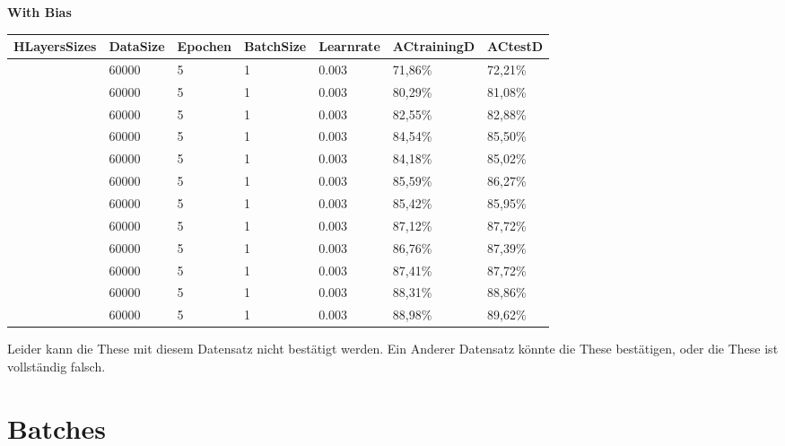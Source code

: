 \documentclass[12pt]{article}
\begin{document}
\begin{table}[H]
    \centering
    \textbf{With Bias}
    \begin{tabular}{|l|l|l|l|l|l|l|}
    \hline
        HLayersSizes & DataSize & Epochen & BatchSize & Learnrate & ACtrainingD & ACtestD \\ \hline
        [784, 10, 10] & 60000 & 5 & 1 & 0.003 & 71,86\% & 72,21\% \\ \hline
        [784, 20, 10] & 60000 & 5 & 1 & 0.003 & 80,29\% & 81,08\% \\ \hline
        [784, 30, 10] & 60000 & 5 & 1 & 0.003 & 82,55\% & 82,88\% \\ \hline
        [784, 40, 10] & 60000 & 5 & 1 & 0.003 & 84,54\% & 85,50\% \\ \hline
        [784, 50, 10] & 60000 & 5 & 1 & 0.003 & 84,18\% & 85,02\% \\ \hline
        [784, 60, 10] & 60000 & 5 & 1 & 0.003 & 85,59\% & 86,27\% \\ \hline
        [784, 70, 10] & 60000 & 5 & 1 & 0.003 & 85,42\% & 85,95\% \\ \hline
        [784, 80, 10] & 60000 & 5 & 1 & 0.003 & 87,12\% & 87,72\% \\ \hline
        [784, 90, 10] & 60000 & 5 & 1 & 0.003 & 86,76\% & 87,39\% \\ \hline
        [784, 100, 10] & 60000 & 5 & 1 & 0.003 & 87,41\% & 87,72\% \\ \hline
        [784, 150, 10] & 60000 & 5 & 1 & 0.003 & 88,31\% & 88,86\% \\ \hline
        [784, 200, 10] & 60000 & 5 & 1 & 0.003 & 88,98\% & 89,62\% \\ \hline
    \end{tabular}
\end{table}
Leider kann die These mit diesem Datensatz nicht bestätigt werden. Ein Anderer Datensatz könnte die These bestätigen, oder die These ist vollständig falsch.
\section{Batches}
\end{document}
